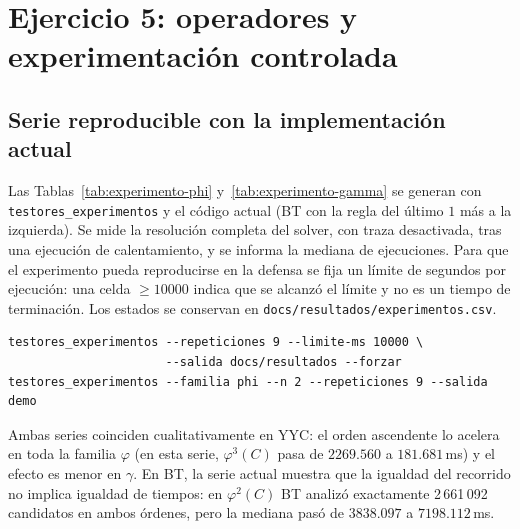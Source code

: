 \documentclass[11pt, a4paper]{article}
\theoremstyle{definition}
\theoremstyle{plain}
\begin{document}
\section{Ejercicio 5: operadores y experimentación controlada}\label{sec:ejercicio5}





\subsection*{Serie reproducible con la implementación actual}

Las Tablas~\ref{tab:experimento-phi} y~\ref{tab:experimento-gamma} se generan con
\texttt{testores\_experimentos} y el código actual (BT con la regla del último $1$
más a la izquierda). Se mide la resolución completa del solver, con traza
desactivada, tras una ejecución de calentamiento, y se informa la mediana de
\RepeticionesExperimento{} ejecuciones. Para que el experimento pueda
reproducirse en la defensa se fija un límite de \LimiteExperimento{} segundos por
ejecución: una celda $\ge10000$ indica que se alcanzó el límite y no es un tiempo
de terminación. Los estados se conservan en \texttt{docs/resultados/experimentos.csv}.
\begin{Verbatim}[fontsize=\small, frame=single]
testores_experimentos --repeticiones 9 --limite-ms 10000 \
                      --salida docs/resultados --forzar
testores_experimentos --familia phi --n 2 --repeticiones 9 --salida demo
\end{Verbatim}

\begin{table}[htbp]
\centering
\small
\resizebox{\textwidth}{!}{}
\caption{Serie reproducible sobre $\varphi^N(C)$ con la implementación actual.}
\label{tab:experimento-phi}
\end{table}

\begin{table}[htbp]
\centering
\small
\resizebox{\textwidth}{!}{}
\caption{Serie reproducible sobre $\gamma^N(C)$ con la implementación actual.}
\label{tab:experimento-gamma}
\end{table}

Ambas series coinciden cualitativamente en YYC: el orden ascendente lo acelera en
toda la familia $\varphi$ (en esta serie, $\varphi^3(C)$ pasa de $2269.560$ a
$181.681$\,ms) y el efecto es menor en $\gamma$. En BT, la serie actual muestra que
la igualdad del recorrido no implica igualdad de tiempos: en $\varphi^2(C)$ BT
analizó exactamente 2\,661\,092 candidatos en ambos órdenes, pero la mediana pasó
de $3838.097$ a $7198.112$\,ms.
\end{document}
